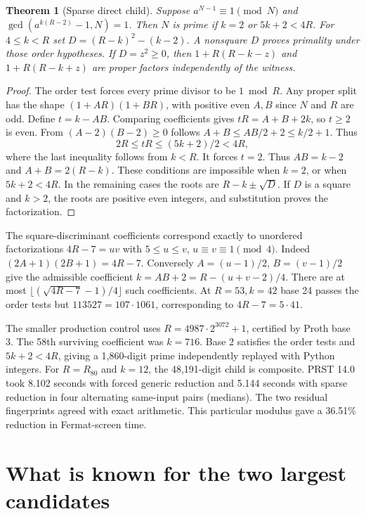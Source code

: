 \documentclass[11pt,a4paper,oneside,openany]{report}
\newtheorem{theorem}{Theorem}[chapter]
\begin{document}
\begin{theorem}[Sparse direct child]\label{cer:sparsedirect}
Suppose $a^{N-1}\equiv1\pmod N$ and $\gcd(a^{k(R-2)}-1,N)=1$. Then $N$ is prime if $k=2$ or $5k+2<4R$. For $4\le k<R$ set $D=(R-k)^2-(k-2)$. A nonsquare $D$ proves primality under those order hypotheses. If $D=z^2\ge0$, then $1+R(R-k-z)$ and $1+R(R-k+z)$ are proper factors independently of the witness.
\end{theorem}
\begin{proof}
The order test forces every prime divisor to be $1\bmod R$. Any proper split has the shape $(1+AR)(1+BR)$, with positive even $A,B$ since $N$ and $R$ are odd. Define $t=k-AB$. Comparing coefficients gives $tR=A+B+2k$, so $t\ge2$ is even. From $(A-2)(B-2)\ge0$ follows $A+B\le AB/2+2\le k/2+1$. Thus
\[
 2R\le tR\le(5k+2)/2<4R,
\]
where the last inequality follows from $k<R$. It forces $t=2$. Thus $AB=k-2$ and $A+B=2(R-k)$. These conditions are impossible when $k=2$, or when $5k+2<4R$. In the remaining cases the roots are $R-k\pm\sqrt D$. If $D$ is a square and $k>2$, the roots are positive even integers, and substitution proves the factorization.
\end{proof}

The square-discriminant coefficients correspond exactly to unordered factorizations $4R-7=uv$ with $5\le u\le v$, $u\equiv v\equiv1\pmod4$. Indeed $(2A+1)(2B+1)=4R-7$. Conversely $A=(u-1)/2$, $B=(v-1)/2$ give the admissible coefficient $k=AB+2=R-(u+v-2)/4$. There are at most $\lfloor(\sqrt{4R-7}-1)/4\rfloor$ such coefficients. At $R=53,k=42$ base 24 passes the order tests but $113527=107\cdot1061$, corresponding to $4R-7=5\cdot41$.

The smaller production control uses $R=4987\cdot2^{3072}+1$, certified by Proth base 3. The 58th surviving coefficient was $k=716$. Base 2 satisfies the order tests and $5k+2<4R$, giving a 1,860-digit prime independently replayed with Python integers. For $R=R_{80}$ and $k=12$, the 48,191-digit child is composite. PRST 14.0 took 8.102 seconds with forced generic reduction and 5.144 seconds with sparse reduction in four alternating same-input pairs (medians). The two residual fingerprints agreed with exact arithmetic. This particular modulus gave a 36.51\% reduction in Fermat-screen time.

\section{What is known for the two largest candidates}
\end{document}
